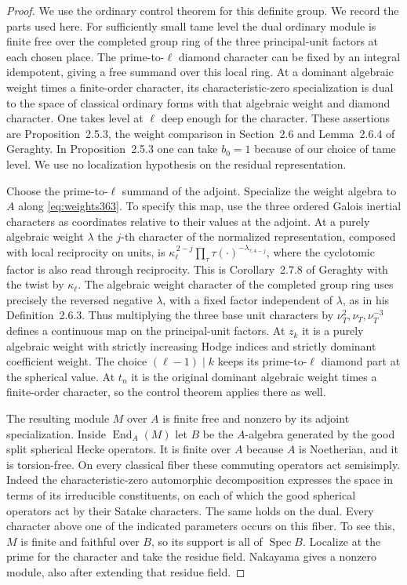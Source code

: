 \documentclass[a4paper,11pt]{article}
\theoremstyle{definition}
\theoremstyle{remark}
\numberwithin{equation}{section}
\begin{document}
\begin{proof}
We use the ordinary control theorem for this definite group.
We record the parts used here. For sufficiently small tame level
the dual ordinary module is finite free over the completed group
ring of the three principal-unit factors at each chosen place.
The prime-to-\(\ell\) diamond character can be fixed by an
integral idempotent, giving a free summand over this local ring.
At a dominant algebraic weight times a finite-order character,
its characteristic-zero specialization is dual to the space of
classical ordinary forms with that algebraic weight and diamond
character. One takes level at \(\ell\) deep enough for the
character. These assertions are Proposition~2.5.3, the
weight comparison in Section~2.6 and Lemma~2.6.4 of Geraghty.
In Proposition~2.5.3 one can take \(b_0=1\) because of our
choice of tame level. We use no localization hypothesis on the
residual representation.~\cite{VII-V-geraghty363}

Choose the prime-to-\(\ell\) summand of the adjoint.
Specialize the weight algebra to \(A\) along
\eqref{eq:weights363}. To specify this map, use the three
ordered Galois inertial characters as coordinates relative to
their values at the adjoint. At a purely algebraic weight
\(\lambda\) the \(j\)-th character of the normalized
representation, composed with local reciprocity on units, is
\(\kappa_\ell^{\,2-j}\prod_\tau\tau(\cdot)^{-\lambda_{\tau,4-j}}\),
where the cyclotomic factor is also read through reciprocity.
This is Corollary~2.7.8 of Geraghty with the twist by
\(\kappa_\ell\). The algebraic weight character of the
completed group ring uses precisely the reversed negative
\(\lambda\), with a fixed factor independent of \(\lambda\),
as in his Definition~2.6.3. Thus multiplying the three base
unit characters by \(\nu_T^2,\nu_T,\nu_T^{-3}\) defines a
continuous map on the principal-unit factors. At \(z_k\) it is
a purely algebraic weight with strictly increasing Hodge indices
and strictly dominant coefficient weight. The choice
\((\ell-1)\mid k\) keeps its prime-to-\(\ell\) diamond part
at the spherical value. At \(t_n\) it is the original dominant
algebraic weight times a finite-order character, so the control
theorem applies there as well.~\cite{VII-V-geraghty363}

The resulting module \(M\) over \(A\) is finite free and nonzero
by its adjoint specialization. Inside \(\operatorname{End}_A(M)\)
let \(B\) be the \(A\)-algebra generated by the good split
spherical Hecke operators. It is finite over \(A\) because \(A\)
is Noetherian, and it is torsion-free. On every classical fiber
these commuting operators act semisimply. Indeed the
characteristic-zero automorphic decomposition expresses the
space in terms of its irreducible constituents, on each of
which the good spherical operators act by their Satake
characters. The same holds on the dual. Every character above
one of the indicated parameters occurs on this fiber. To see
this, \(M\) is finite and faithful over \(B\), so its support
is all of \(\operatorname{Spec}B\). Localize at the prime for
the character and take the residue field. Nakayama gives a
nonzero module, also after extending that residue field.


\end{proof}
\end{document}
